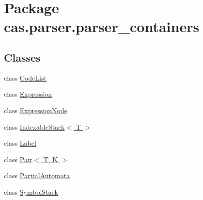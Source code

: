 \hypertarget{namespacecas_1_1parser_1_1parser__containers}{\section{Package cas.\-parser.\-parser\-\_\-containers}
\label{namespacecas_1_1parser_1_1parser__containers}
}
\subsection*{Classes}
\begin{DoxyCompactItemize}
\item 
class \hyperlink{classcas_1_1parser_1_1parser__containers_1_1_code_list}{Code\-List}
\item 
class \hyperlink{classcas_1_1parser_1_1parser__containers_1_1_expression}{Expression}
\item 
class \hyperlink{classcas_1_1parser_1_1parser__containers_1_1_expression_node}{Expression\-Node}
\item 
class \hyperlink{classcas_1_1parser_1_1parser__containers_1_1_indexable_stack_3_01_t_01_4}{Indexable\-Stack$<$ T $>$}
\item 
class \hyperlink{classcas_1_1parser_1_1parser__containers_1_1_label}{Label}
\item 
class \hyperlink{classcas_1_1parser_1_1parser__containers_1_1_pair_3_01_t_00_01_k_01_4}{Pair$<$ T, K $>$}
\item 
class \hyperlink{classcas_1_1parser_1_1parser__containers_1_1_partial_automata}{Partial\-Automata}
\item 
class \hyperlink{classcas_1_1parser_1_1parser__containers_1_1_symbol_stack}{Symbol\-Stack}
\end{DoxyCompactItemize}
